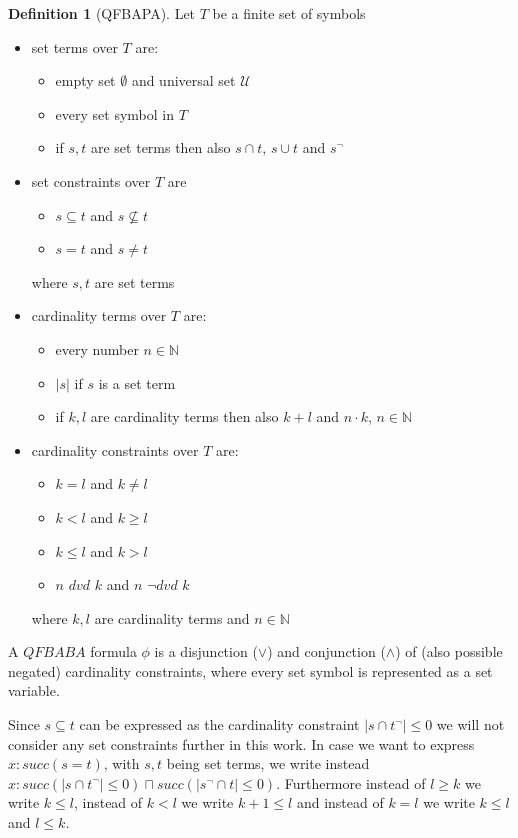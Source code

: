 \documentclass{book}
\theoremstyle{break}
\theoremstyle{definition}
\newtheorem{mydef}{Definition}
\begin{document}
\begin{mydef}[QFBAPA]
Let $T$ be a finite set of symbols
\begin{itemize}
\item set terms over $T$ are:
\begin{itemize}
\item empty set $\emptyset$ and universal set $
\mathcal{U}$
\item every set symbol in $T$
\item if $s,t$ are set terms then also $s\cap t$, $s\cup t$ and $s^{\neg}$
\end{itemize}
\item set constraints over $T$ are
\begin{itemize}
\item $s\subseteq t$ and $s\not\subseteq t$
\item $s=t$ and $s\neq t$
\end{itemize}
where $s,t$ are set terms
\item cardinality terms over $T$ are:
\begin{itemize}
\item every number $n\in \mathbb{N}$
\item $|s|$ if $s$ is a set term
\item if $k,l$ are cardinality terms then also $k+l$ and $n\cdot k$, $n\in \mathbb{N}$
\end{itemize}
\item cardinality constraints over $T$ are:
\begin{itemize}
\item $k=l$ and $k\neq l$
\item $k<l$ and $k\geq l$
\item $k\leq l$ and $k>l$
\item $n$ $dvd$ $k$ and $n$ $\neg dvd$ $k$
\end{itemize}
where $k,l$ are cardinality terms and $n\in\mathbb{N}$
\end{itemize}
A $QFBABA$ formula $\phi$ is a disjunction ($\vee$) and conjunction ($\wedge$) of (also possible negated) cardinality constraints, where every set symbol is represented as a set variable.
\end{mydef}
Since $s\subseteq t$ can be expressed as the cardinality constraint $|s\cap t^\neg|\leq 0$ we will not consider any set constraints further in this work. In case we want to express $x:succ(s=t)$, with $s,t$ being set terms, we write instead $x:succ(|s\cap t^\neg|\leq 0)\sqcap succ(|s^\neg\cap t|\leq 0)$. Furthermore instead of $l\geq k$ we write $k\leq l$, instead of $k<l$ we write $k+1\leq l$ and instead of $k=l$ we write $k\leq l$ and $l\leq k$.\\
\end{document}
